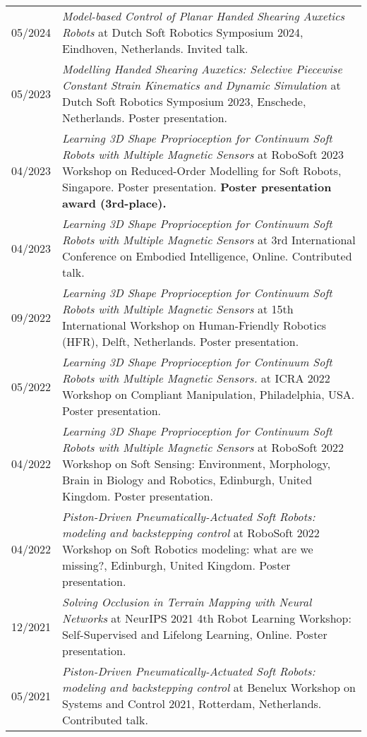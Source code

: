 \begin{longtable}{p{} p{}}
    05/2024 & \emph{Model-based Control of Planar Handed Shearing Auxetics Robots} at Dutch Soft Robotics Symposium 2024, Eindhoven, Netherlands. Invited talk.\\
    05/2023 & \emph{Modelling Handed Shearing Auxetics: Selective Piecewise Constant Strain Kinematics and Dynamic Simulation} at Dutch Soft Robotics Symposium 2023, Enschede, Netherlands. Poster presentation.\\
    04/2023 & \emph{Learning 3D Shape Proprioception for Continuum Soft Robots with Multiple Magnetic Sensors} at RoboSoft 2023 Workshop on Reduced-Order Modelling for Soft Robots, Singapore. Poster presentation. \textbf{Poster presentation award (3rd-place).}\\
    04/2023 & \emph{Learning 3D Shape Proprioception for Continuum Soft Robots with Multiple Magnetic Sensors} at 3rd International Conference on Embodied Intelligence, Online. Contributed talk.\\
    09/2022 & \emph{Learning 3D Shape Proprioception for Continuum Soft Robots with Multiple Magnetic Sensors} at 15th International Workshop on Human-Friendly Robotics (HFR), Delft, Netherlands. Poster presentation.\\
    05/2022 & \emph{Learning 3D Shape Proprioception for Continuum Soft Robots with Multiple Magnetic Sensors.} at ICRA 2022 Workshop on Compliant Manipulation, Philadelphia, USA. Poster presentation.\\
    04/2022 & \emph{Learning 3D Shape Proprioception for Continuum Soft Robots with Multiple Magnetic Sensors} at RoboSoft 2022 Workshop on Soft Sensing: Environment, Morphology, Brain in Biology and Robotics, Edinburgh, United Kingdom. Poster presentation.\\
    04/2022 & \emph{Piston-Driven Pneumatically-Actuated Soft Robots: modeling and backstepping control} at RoboSoft 2022 Workshop on Soft Robotics modeling: what are we missing?, Edinburgh, United Kingdom. Poster presentation.\\
    12/2021 & \emph{Solving Occlusion in Terrain Mapping with Neural Networks} at NeurIPS 2021 4th Robot Learning Workshop: Self-Supervised and Lifelong Learning, Online. Poster presentation.\\
    05/2021 & \emph{Piston-Driven Pneumatically-Actuated Soft Robots: modeling and backstepping control} at Benelux Workshop on Systems and Control 2021, Rotterdam, Netherlands. Contributed talk.\\
\end{longtable}